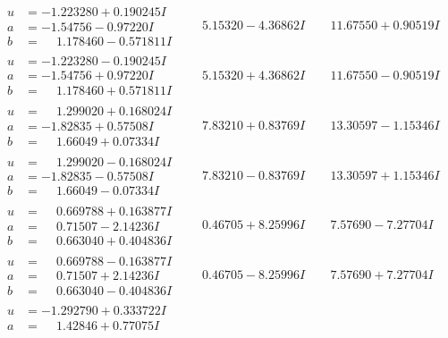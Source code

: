 \documentclass[1p]{elsarticle_modified}
\theoremstyle{definition}
\begin{document}
$$\begin{array}{c|c|c}
\begin{aligned}
u &= -1.223280 + 0.190245 I \\
a &= -1.54756 - 0.97220 I \\
b &= \phantom{-}1.178460 - 0.571811 I\end{aligned}
 & \phantom{-}5.15320 - 4.36862 I & \phantom{-}11.67550 + 0.90519 I \\ \hline\begin{aligned}
u &= -1.223280 - 0.190245 I \\
a &= -1.54756 + 0.97220 I \\
b &= \phantom{-}1.178460 + 0.571811 I\end{aligned}
 & \phantom{-}5.15320 + 4.36862 I & \phantom{-}11.67550 - 0.90519 I \\ \hline\begin{aligned}
u &= \phantom{-}1.299020 + 0.168024 I \\
a &= -1.82835 + 0.57508 I \\
b &= \phantom{-}1.66049 + 0.07334 I\end{aligned}
 & \phantom{-}7.83210 + 0.83769 I & \phantom{-}13.30597 - 1.15346 I \\ \hline\begin{aligned}
u &= \phantom{-}1.299020 - 0.168024 I \\
a &= -1.82835 - 0.57508 I \\
b &= \phantom{-}1.66049 - 0.07334 I\end{aligned}
 & \phantom{-}7.83210 - 0.83769 I & \phantom{-}13.30597 + 1.15346 I \\ \hline\begin{aligned}
u &= \phantom{-}0.669788 + 0.163877 I \\
a &= \phantom{-}0.71507 - 2.14236 I \\
b &= \phantom{-}0.663040 + 0.404836 I\end{aligned}
 & \phantom{-}0.46705 + 8.25996 I & \phantom{-}7.57690 - 7.27704 I \\ \hline\begin{aligned}
u &= \phantom{-}0.669788 - 0.163877 I \\
a &= \phantom{-}0.71507 + 2.14236 I \\
b &= \phantom{-}0.663040 - 0.404836 I\end{aligned}
 & \phantom{-}0.46705 - 8.25996 I & \phantom{-}7.57690 + 7.27704 I \\ \hline\begin{aligned}
u &= -1.292790 + 0.333722 I \\
a &= \phantom{-}1.42846 + 0.77075 I \\

\end{aligned}
\end{array}$$
\end{document}
